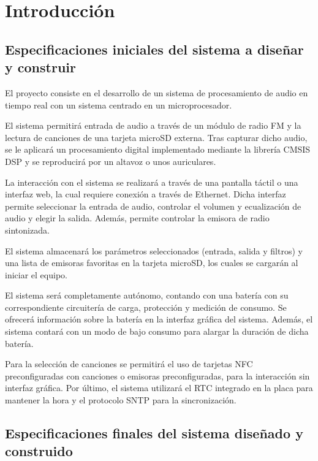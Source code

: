 \section{Introducción}

\subsection{Especificaciones iniciales del sistema a diseñar y construir}

El proyecto consiste en el desarrollo de un sistema de procesamiento de audio en tiempo real con un sistema centrado en un microprocesador.

El sistema permitirá entrada de audio a través de un módulo de radio FM y la lectura de canciones de una tarjeta microSD externa. Tras capturar dicho audio, se le aplicará un procesamiento digital implementado mediante la librería CMSIS DSP y se reproducirá por un altavoz o unos auriculares.

La interacción con el sistema se realizará a través de una pantalla táctil o una interfaz web, la cual requiere conexión a través de Ethernet. Dicha interfaz permite seleccionar la entrada de audio, controlar el volumen y ecualización de audio y elegir la salida. Además, permite controlar la emisora de radio sintonizada.

El sistema almacenará los parámetros seleccionados (entrada, salida y filtros) y una lista de emisoras favoritas en la tarjeta microSD, los cuales se cargarán al iniciar el equipo.

El sistema será completamente autónomo, contando con una batería con su correspondiente circuitería de carga, protección y medición de consumo. Se ofrecerá información sobre la batería en la interfaz gráfica del sistema. Además, el sistema contará con un modo de bajo consumo para alargar la duración de dicha batería.

Para la selección de canciones se permitirá el uso de tarjetas NFC preconfiguradas con canciones o emisoras preconfiguradas, para la interacción sin interfaz gráfica. Por último, el sistema utilizará el RTC integrado en la placa para mantener la hora y el protocolo SNTP para la sincronización.

\subsection{Especificaciones finales del sistema diseñado y construido}